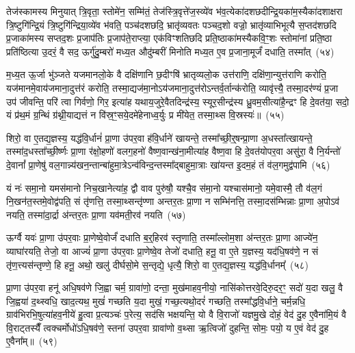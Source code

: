 तेज॑स्कामस्य मिनुयात् त्रि॒वृता॒ स्तोमे॑न॒ सम्मि॑तं॒ तेज॑स्त्रि॒वृत्\-ते॑ज॒स्व्ये॑व भ॑व॒त्येका॑\-दशछदीन्द्रि॒यका॑म॒स्यैका॑\-दशाक्षरा त्रि॒ष्टुगि॑न्द्रि॒यं त्रि॒ष्टुगि॑न्द्रिया॒व्ये॑व भ॑वति॒ पञ्च॑दशछदि॒ भ्रातृ॑व्यवतः पञ्चद॒शो वज्रो॒ भ्रातृ॑व्याभिभूत्यै स॒प्तद॑शछदि प्र॒जाका॑मस्य सप्तद॒शः प्र॒जा\-प॑तिः प्र॒जा\-प॑ते॒राप्त्या॒ एक॑विꣳशतिछदि प्रति॒ष्ठाका॑मस्यैकवि॒ꣳ॒शः स्तोमा॑नां प्रति॒ष्ठा प्रति॑ष्ठित्या उ॒दरं॒ वै सद॒ ऊर्गु॑दु॒म्बरो॑ मध्य॒त औदु॑म्बरीं मिनोति मध्य॒त ए॒व प्र॒जाना॒मूर्जं॑ दधाति॒ तस्मा᳚त्~(५४)\ip

म॒ध्य॒त ऊ॒र्जा भु॑ञ्जते यजमानलो॒के वै दक्षि॑णानि छ॒दीꣳषि॑ भ्रातृव्यलो॒क उत्त॑राणि॒ दक्षि॑णा॒न्युत्त॑राणि करोति॒ यज॑मानमे॒वाय॑जमाना॒दुत्त॑रं करोति॒ तस्मा॒द्यज॑मा॒नो\-ऽय॑जमाना॒दुत्त॑रो\-ऽन्तर्व॒र्तान्क॑रोति॒ व्यावृ॑त्त्यै॒ तस्मा॒दर॑ण्यं प्र॒जा उप॑ जीवन्ति॒ परि॑ त्वा गिर्वणो॒ गिर॒ इत्या॑ह यथाय॒जुरे॒वैतदिन्द्र॑स्य॒ स्यूर॒सीन्द्र॑स्य ध्रु॒वम॒सीत्या॑है॒न्द्रꣳ हि दे॒वत॑या॒ सदो॒ यं प्र॑थ॒मं ग्र॒न्थिं ग्र॑थ्नी॒याद्यत्तं न वि॑स्र॒ꣳ॒सये॒दमे॑हेनाध्व॒र्युः प्र मी॑येत॒ तस्मा॒थ्स वि॒स्रस्यः॑॥~(५५)\ip

{\anuvakamend[{अप॑हत्यै॒ तस्मा᳚त्पितृदेव॒त्य॑न्तेनै॒व नव॑छदि॒ तस्मा॒थ्सदः॒ पञ्च॑दश च}]}%

शिरो॒ वा ए॒तद्य॒ज्ञस्य॒ यद्ध॑वि॒र्धानं॑ प्रा॒णा उ॑पर॒वा ह॑वि॒र्धाने॑ खायन्ते॒ तस्मा᳚च्छी॒र्॒\mbox{}षन्प्रा॒णा अ॒धस्ता᳚त्खायन्ते॒ तस्मा॑द॒धस्ता᳚च्छी॒र्ष्णः प्रा॒णा र॑क्षो॒हणो॑ वलग॒हनो॑ वैष्ण॒वान्ख॑ना॒मीत्या॑ह वैष्ण॒वा हि दे॒वत॑योपर॒वा असु॑रा॒ वै नि॒र्यन्तो॑ दे॒वानां᳚ प्रा॒णेषु॑ वल॒गान्न्य॑खन॒न्तान्बा॑हुमा॒त्रे\-ऽन्व॑विन्द॒न्तस्मा᳚द्\-बाहुमा॒त्राः खा॑यन्त इ॒दम॒हं तं व॑ल॒गमुद्व॑पामि~(५६)\ip

यं नः॑ समा॒नो यमस॑मानो निच॒खानेत्या॑ह॒ द्वौ वाव पुरु॑षौ॒ यश्चै॒व स॑मा॒नो यश्चास॑मानो॒ यमे॒वास्मै॒ तौ व॑ल॒गं नि॒खन॑त॒स्तमे॒वोद्व॑पति॒ सं तृ॑णत्ति॒ तस्मा॒थ्सन्तृ॑ण्णा अन्तर॒तः प्रा॒णा न सम्भि॑नत्ति॒ तस्मा॒दस॑म्भिन्नाः प्रा॒णा अ॒पो\-ऽव॑ नयति॒ तस्मा॑दा॒र्द्रा अ॑न्तर॒तः प्रा॒णा यव॑मती॒रव॑ नयति~(५७)\ip

ऊर्ग्वै यवः॑ प्रा॒णा उ॑पर॒वाः प्रा॒णेष्वे॒वोर्जं॑ दधाति ब॒र्॒\mbox{}हिरव॑ स्तृणाति॒ तस्मा᳚ल्लोम॒शा अ॑न्तर॒तः प्रा॒णा आज्ये॑न॒ व्याघा॑रयति॒ तेजो॒ वा आज्यं॑ प्रा॒णा उ॑पर॒वाः प्रा॒णेष्वे॒व तेजो॑ दधाति॒ हनू॒ वा ए॒ते य॒ज्ञस्य॒ यद॑धि॒षव॑णे॒ न सं तृ॑ण॒त्त्यस॑न्तृण्णे॒ हि हनू॒ अथो॒ खलु॑ दीर्घसो॒मे स॒न्तृद्ये॒ धृत्यै॒ शिरो॒ वा ए॒तद्य॒ज्ञस्य॒ यद्ध॑वि॒र्धानम्᳚~(५८)\ip

प्रा॒णा उ॑पर॒वा हनू॑ अधि॒षव॑णे जि॒ह्वा चर्म॒ ग्रावा॑णो॒ दन्ता॒ मुख॑माहव॒नीयो॒ नासि॑कोत्तरवे॒दिरु॒दर॒ꣳ॒ सदो॑ य॒दा खलु॒ वै जि॒ह्वया॑ द॒थ्स्वधि॒ खाद॒त्यथ॒ मुखं॑ गच्छति य॒दा मुखं॒ गच्छ॒त्यथो॒दरं॑ गच्छति॒ तस्मा᳚द्\-धवि॒र्धाने॒ चर्म॒न्नधि॒ ग्राव॑भिरभि॒षुत्या॑हव॒नीये॑ हु॒त्वा प्र॒त्यञ्चः॑ प॒रेत्य॒ सद॑सि भक्षयन्ति॒ यो वै वि॒राजो॑ यज्ञमु॒खे दोहं॒ वेद॑ दु॒ह ए॒वैना॑मि॒यं वै वि॒राट्तस्यैँ त्वक्चर्मोधो॑\-ऽधि॒षव॑णे॒ स्तना॑ उपर॒वा ग्रावा॑णो व॒थ्सा ऋ॒त्विजो॑ दुहन्ति॒ सोमः॒ पयो॒ य ए॒वं वेद॑ दु॒ह ए॒वैना᳚म्॥~(५९)\ip

